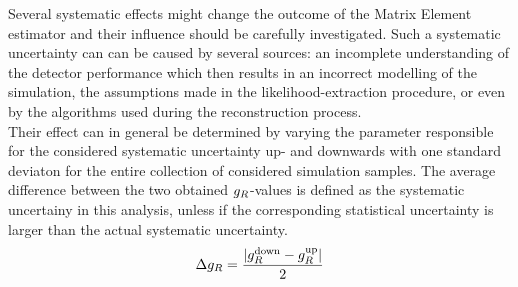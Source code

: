 Several systematic effects might change the outcome of the Matrix Element estimator and their influence should be carefully investigated.
Such a systematic uncertainty can can be caused by several sources: an incomplete understanding of the detector performance which then results in an incorrect modelling of the simulation, the assumptions made in the likelihood-extraction procedure, or even by the algorithms used during the reconstruction process.
\\
Their effect can in general be determined by varying the parameter responsible for the considered systematic uncertainty up- and downwards with one standard deviaton for the entire collection of considered simulation samples.
The average difference between the two obtained $g_{R}$-values is defined as the systematic uncertainy in this analysis, unless if the corresponding statistical uncertainty is larger than the actual systematic uncertainty.
\begin{equation} \label{eq::Syst}
 \Delta \gR =  \frac{\vert \gR^{\textrm{down}} - \gR^{\textrm{up}} \vert}{2} %
\end{equation}

